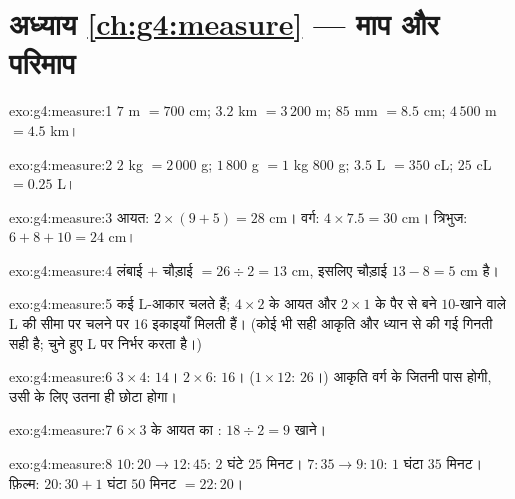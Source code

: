\section*{अध्याय \ref{ch:g4:measure} --- माप और परिमाप}

\begin{solution}{exo:g4:measure:1}
$7$ m $= 700$ cm; \quad $3.2$ km $= 3\,200$ m; \quad
$85$ mm $= 8.5$ cm; \quad $4\,500$ m $= 4.5$ km।
\end{solution}

\begin{solution}{exo:g4:measure:2}
$2$ kg $= 2\,000$ g; \quad $1\,800$ g $= 1$ kg $800$ g; \quad
$3.5$ L $= 350$ cL; \quad $25$ cL $= 0.25$ L।
\end{solution}

\begin{solution}{exo:g4:measure:3}
आयत: $2 \times (9 + 5) = 28$ cm। वर्ग:
$4 \times 7.5 = 30$ cm। त्रिभुज: $6 + 8 + 10 = 24$ cm।
\end{solution}

\begin{solution}{exo:g4:measure:4}
लंबाई $+$ चौड़ाई $= 26 \div 2 = 13$ cm, इसलिए चौड़ाई
$13 - 8 = 5$ cm है।
\end{solution}

\begin{solution}{exo:g4:measure:5}
कई L-आकार चलते हैं; $4 \times 2$ के आयत और $2 \times 1$ के पैर
से बने $10$-खाने वाले L की सीमा पर चलने पर $16$ इकाइयाँ मिलती
हैं। (कोई भी सही आकृति और ध्यान से की गई गिनती सही है; 
चुने हुए L पर निर्भर करता है।)
\end{solution}

\begin{solution}{exo:g4:measure:6}
$3 \times 4$:  $14$। $2 \times 6$:  $16$।
($1 \times 12$:  $26$।) आकृति वर्ग के जितनी पास होगी,
उसी  के लिए  उतना ही छोटा होगा।
\end{solution}

\begin{solution}{exo:g4:measure:7}
$6 \times 3$ के आयत का : $18 \div 2 = 9$ खाने।
\end{solution}

\begin{solution}{exo:g4:measure:8}
$10{:}20 \to 12{:}45$: $2$ घंटे $25$ मिनट। $7{:}35 \to 9{:}10$:
$1$ घंटा $35$ मिनट। फ़िल्म: $20{:}30 + 1$ घंटा $50$ मिनट $= 22{:}20$।
\end{solution}

